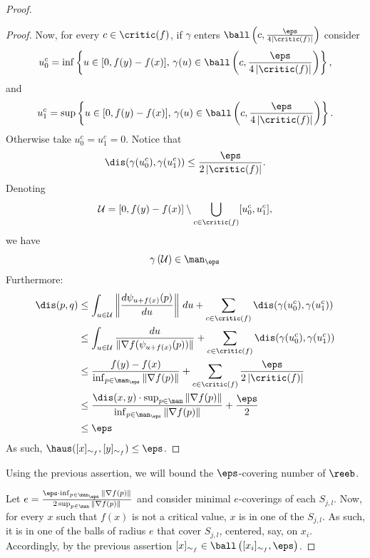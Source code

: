 \begin{proof}
\begin{proof}
Now, for every $c\in\critic(f)$, if $\gamma$ enters $\ball\left(c,\frac{\eps}{4\left|\critic(f)\right|}\right)$ consider 
$$u^c_0=\inf\left\{u\in[0,f(y)-f(x)],\,\gamma(u)\in \ball\left(c,\frac{\eps}{4\left|\critic(f)\right|}\right)\right\},$$
and 
$$u^c_1=\sup\left\{u\in[0,f(y)-f(x)],\,\gamma(u)\in \ball\left(c,\frac{\eps}{4\left|\critic(f)\right|}\right)\right\}.$$
Otherwise take $u^c_0=u^c_1=0$.
Notice that
$$\dis(\gamma(u^c_0),\gamma(u^c_1))\leq \frac{\eps}{2\left|\critic(f)\right|}.$$
Denoting
 $$\mathcal{U}=[0,f(y)-f(x)]\setminus\bigcup_{c \in \critic(f)}[u^c_0,u^c_1],$$
 we have 
 $$\gamma\left(\mathcal{U}\right)\in\man_\eps$$
 Furthermore:
\begin{align*}
\dis(p,q)&\leq\int_{u\in \mathcal{U}}\left\Vert\frac{d\psi_{u+f(x)}(p)}{du}\right\Vert\,du + \sum_{c \in \critic(f)} \dis(\gamma(u^c_0),\gamma(u^c_1))\\
&\leq\int_{u\in \mathcal{U}}\frac{du}{\Vert\nabla f(\psi_{u+f(x)}(p))\Vert} + \sum_{c \in \critic(f)} \dis(\gamma(u^c_0),\gamma(u^c_1))\\
&\leq\frac{f(y)-f(x)}{\inf_{p\in\man_\eps}\Vert\nabla f(p)\Vert}+ \sum_{c \in \critic(f)} \frac{\eps}{2\left|\critic(f)\right|}\\
&\leq\frac{\dis(x,y)\cdot \sup_{p\in\man}\Vert\nabla f(p)\Vert}{\inf_{p\in\man_\eps}\Vert\nabla f(p)\Vert}+\frac{\eps}{2}\\
&\leq\eps
\end{align*}
 As such, $\haus([x]_{\sim_f},[y]_{\sim_f})\leq\eps$.
 \end{proof}
 
 Using the previous assertion, we will bound the $\eps$-covering number of $\reeb$.
 
Let $e=\frac{\eps\cdot \inf_{p\in\man_\eps}\Vert\nabla f(p)\Vert}{2\sup_{p\in\man}\Vert\nabla f(p)\Vert}$ and consider minimal $e$-coverings of each $S_{j,l}$.
%
Now, for every $x$ such that $f(x)$ is not a critical value, $x$ is in one of the $S_{j,l}$. As such, it is in one of the balls of radius $e$ that cover $S_{j,l}$, centered, say, on $x_i$. Accordingly, by the previous assertion $[x]_{\sim_f}\in\ball\left([x_i]_{\sim_f},\eps\right)$.


\end{proof}
